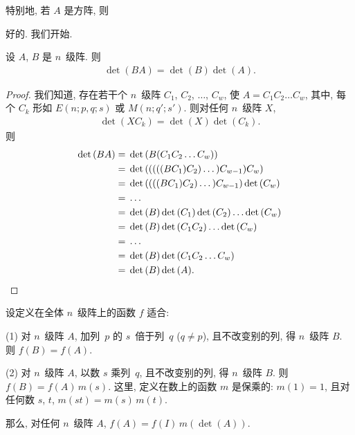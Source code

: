 \documentclass[../libro.tex]{subfiles}
\begin{document}
\TheoremMultiplyAndMultipljadVersionOne*

特别地, 若 \(A\) 是方阵, 则

\TheoremMultiplyAndMultipljadVersionTwo*

好的.
我们开始.

\begin{theorem}
    设 \(A\), \(B\) 是 \(n\)~级阵.
    则
    \begin{align*}
        \det {(BA)} = \det {(B)} \det {(A)}.
    \end{align*}
\end{theorem}

\begin{proof}
    我们知道,
    存在若干个 \(n\)~级阵
    \(C_1\), \(C_2\), \(\dots\), \(C_w\),
    使 \(A = C_1 C_2 \dots C_w\),
    其中, 每个 \(C_k\) 形如
    \(E(n; p, q; s)\) 或 \(M(n; q'; s')\).
    则对任何 \(n\)~级阵 \(X\),
    \begin{align*}
        \det {(X C_k)} = \det {(X)} \det {(C_k)}.
    \end{align*}
    则
    \begin{align*}
        \det {(B A)}
        = {} &
        \det {(B (C_1 C_2 \dots C_w))}
        \\
        = {} &
        \det {(((((B C_1) C_2) \dots) C_{w-1}) C_w)}
        \\
        = {} &
        \det {((((B C_1) C_2) \dots) C_{w-1})}
        \det {(C_w)}
        \\
        = {} &
        \dots
        \\
        = {} &
        \det {(B)} \det {(C_1)} \det {(C_2)} \dots \det {(C_w)}
        \\
        = {} &
        \det {(B)} \det {(C_1 C_2)} \dots \det {(C_w)}
        \\
        = {} &
        \dots
        \\
        = {} &
        \det {(B)} \det {(C_1 C_2 \dots C_w)}
        \\
        = {} &
        \det {(B)} \det {(A)}.
        \qedhere
    \end{align*}
\end{proof}

\begin{theorem}
    设定义在全体 \(n\)~级阵上的函数 \(f\) 适合:

    (1)
    对 \(n\)~级阵 \(A\),
    加列~\(p\) 的 \(s\)~倍于列~\(q\)
    (\(q \neq p\)),
    且不改变别的列,
    得 \(n\)~级阵 \(B\).
    则 \(f(B) = f(A)\).

    (2)
    对 \(n\)~级阵 \(A\),
    以数 \(s\) 乘列~\(q\),
    且不改变别的列,
    得 \(n\)~级阵 \(B\).
    则 \(f(B) = f(A)\, m(s)\).
    这里, 定义在数上的函数 \(m\) 是保乘的:
    \(m(1) = 1\),
    且对任何数 \(s\), \(t\), \(m(st) = m(s)\, m(t)\).

    那么, 对任何 \(n\)~级阵 \(A\),
    \(f(A) = f(I)\, m(\det {(A)})\).
\end{theorem}
\end{document}
